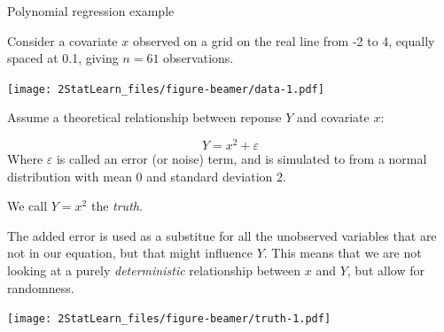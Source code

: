 \documentclass[ignorenonframetext,]{beamer}
\begin{document}
\begin{frame}

\begin{block}{Polynomial regression example}

Consider a covariate \(x\) observed on a grid on the real line from -2
to 4, equally spaced at 0.1, giving \(n=61\) observations.

\texttt{[image: 2StatLearn\_files/figure-beamer/data-1.pdf]}

\end{block}

\end{frame}

\begin{frame}

Assume a theoretical relationship between reponse \(Y\) and covariate
\(x\):

\[ Y=x^2 + \varepsilon\] Where \(\varepsilon\) is called an error (or
noise) term, and is simulated to from a normal distribution with mean 0
and standard deviation 2.

We call \(Y=x^2\) the \emph{truth}.

The added error is used as a substitue for all the unobserved variables
that are not in our equation, but that might influence \(Y\). This means
that we are not looking at a purely \emph{deterministic} relationship
between \(x\) and \(Y\), but allow for randomness.

\end{frame}

\begin{frame}

\texttt{[image: 2StatLearn\_files/figure-beamer/truth-1.pdf]}

\end{frame}
\end{document}
